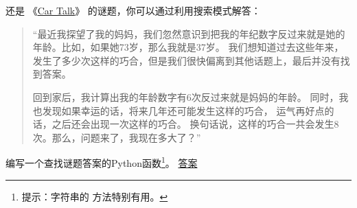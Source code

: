 \begin{exercise}

还是 《\href{http://www.cartalk.com/content/puzzlers}{Car Talk}》 的谜题，你可以通过利用搜索模式解答：
    


\begin{quote}

    ``最近我探望了我的妈妈，我们忽然意识到把我的年纪数字反过来就是她的年龄。比如，如果她73岁，那么我就是37岁。
    我们想知道过去这些年来，发生了多少次这样的巧合，但是我们很快偏离到其他话题上，最后并没有找到答案。

    回到家后，我计算出我的年龄数字有6次反过来就是妈妈的年龄。
    同时，我也发现如果幸运的话，将来几年还可能发生这样的巧合，
    运气再好点的话，之后还会出现一次这样的巧合。
    换句话说，这样的巧合一共会发生8次。那么，问题来了，我现在多大了？''

\end{quote}


编写一个查找谜题答案的Python函数\footnote{提示：字符串的  方法特别有用。}。
\href{http://thinkpython2.com/code/cartalk3.py}{答案}


\end{exercise}
